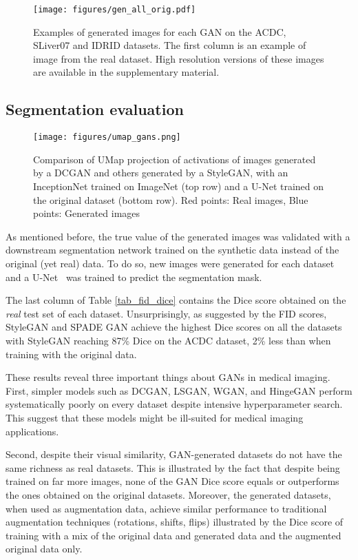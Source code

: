 \documentclass[preprint,12pt, authoryear]{elsarticle}
\begin{document}
\begin{figure*}[ht]
\centering
\texttt{[image: figures/gen\_all\_orig.pdf]}
\caption{\small Examples of generated images for each GAN on the ACDC, SLiver07 and IDRID datasets. The first column is an example of image from the real dataset.  High resolution versions of these images are available in the supplementary material.}
\label{fig_gen_images_ex}
\end{figure*}
\subsection{Segmentation evaluation}
\label{sec:seg_eval}


\begin{figure}[h]
\texttt{[image: figures/umap\_gans.png]}
  \caption{\small Comparison of UMap projection of activations of images generated by a DCGAN and others generated by a StyleGAN, with an InceptionNet trained on ImageNet (top row) and a U-Net trained on the original dataset (bottom row). Red points: Real images, Blue points: Generated images }
\label{fig_umap_comparison}
\end{figure}

As mentioned before, the true value of the generated images was validated with a downstream segmentation network trained on the synthetic data instead of the original (yet real) data.  To do so,  new images were generated for each dataset and a U-Net~\citep{ronneberger2015u} was trained to predict the segmentation mask.  

The last column of Table \ref{tab_fid_dice} contains the Dice score obtained on the {\em real} test set of each dataset.  Unsurprisingly, as suggested by the FID scores, StyleGAN and SPADE GAN achieve the highest Dice scores on all the datasets with StyleGAN reaching 87\% Dice on the ACDC dataset, 2\% less than when training with the original data. 

These results reveal three important things about GANs in medical imaging.  
First, simpler models such as DCGAN, LSGAN, WGAN, and HingeGAN perform systematically poorly on every dataset despite intensive hyperparameter search.  This suggest that these models might be ill-suited for medical imaging applications. 

Second, despite their visual similarity, GAN-generated datasets do not have the same richness as real datasets.  This is illustrated by the fact that despite being trained on far more images, none of the GAN Dice score equals or outperforms the ones obtained on the original datasets. Moreover, the generated datasets, when used as augmentation data, achieve similar performance to traditional augmentation techniques (rotations, shifts, flips) illustrated by the Dice score of training with a mix of the original data and generated data and the augmented original data only.
\end{document}
